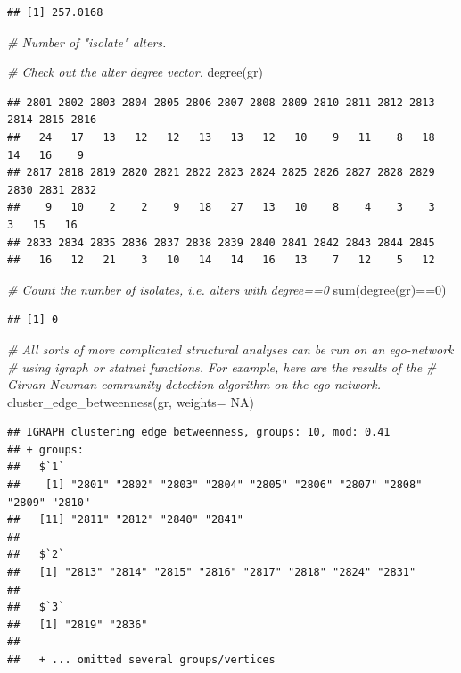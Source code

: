 \documentclass[
]{book}
\newenvironment{Shaded}{\begin{snugshade}}{\end{snugshade}}
\newcommand{\AttributeTok}[1]{\textcolor[rgb]{0.77,0.63,0.00}{#1}}
\newcommand{\CommentTok}[1]{\textcolor[rgb]{0.56,0.35,0.01}{\textit{#1}}}
\newcommand{\ConstantTok}[1]{\textcolor[rgb]{0.00,0.00,0.00}{#1}}
\newcommand{\DecValTok}[1]{\textcolor[rgb]{0.00,0.00,0.81}{#1}}
\newcommand{\FunctionTok}[1]{\textcolor[rgb]{0.00,0.00,0.00}{#1}}
\newcommand{\NormalTok}[1]{#1}
\newcommand{\SpecialCharTok}[1]{\textcolor[rgb]{0.00,0.00,0.00}{#1}}
\begin{document}
\begin{verbatim}
## [1] 257.0168
\end{verbatim}

\begin{Shaded}
\begin{Highlighting}[]
\CommentTok{\# Number of "isolate" alters.}

\CommentTok{\# Check out the alter degree vector.}
\FunctionTok{degree}\NormalTok{(gr)}
\end{Highlighting}
\end{Shaded}

\begin{verbatim}
## 2801 2802 2803 2804 2805 2806 2807 2808 2809 2810 2811 2812 2813 2814 2815 2816 
##   24   17   13   12   12   13   13   12   10    9   11    8   18   14   16    9 
## 2817 2818 2819 2820 2821 2822 2823 2824 2825 2826 2827 2828 2829 2830 2831 2832 
##    9   10    2    2    9   18   27   13   10    8    4    3    3    3   15   16 
## 2833 2834 2835 2836 2837 2838 2839 2840 2841 2842 2843 2844 2845 
##   16   12   21    3   10   14   14   16   13    7   12    5   12
\end{verbatim}

\begin{Shaded}
\begin{Highlighting}[]
\CommentTok{\# Count the number of isolates, i.e. alters with degree==0}
\FunctionTok{sum}\NormalTok{(}\FunctionTok{degree}\NormalTok{(gr)}\SpecialCharTok{==}\DecValTok{0}\NormalTok{)}
\end{Highlighting}
\end{Shaded}

\begin{verbatim}
## [1] 0
\end{verbatim}

\begin{Shaded}
\begin{Highlighting}[]
\CommentTok{\# All sorts of more complicated structural analyses can be run on an ego{-}network}
\CommentTok{\# using igraph or statnet functions. For example, here are the results of the}
\CommentTok{\# Girvan{-}Newman community{-}detection algorithm on the ego{-}network.}
\FunctionTok{cluster\_edge\_betweenness}\NormalTok{(gr, }\AttributeTok{weights=} \ConstantTok{NA}\NormalTok{)}
\end{Highlighting}
\end{Shaded}

\begin{verbatim}
## IGRAPH clustering edge betweenness, groups: 10, mod: 0.41
## + groups:
##   $`1`
##    [1] "2801" "2802" "2803" "2804" "2805" "2806" "2807" "2808" "2809" "2810"
##   [11] "2811" "2812" "2840" "2841"
##   
##   $`2`
##   [1] "2813" "2814" "2815" "2816" "2817" "2818" "2824" "2831"
##   
##   $`3`
##   [1] "2819" "2836"
##   
##   + ... omitted several groups/vertices
\end{verbatim}
\end{document}
